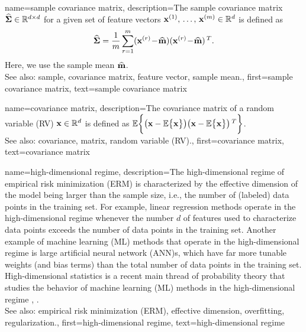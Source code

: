 {	
{name={sample covariance matrix}, 
	description={The 
		sample covariance matrix $\widehat{\bf \Sigma} \in \mathbb{R}^{d \times d}$ 
		for a given set of feature vectors ${\bf x}^{(1)}, \,\ldots, \,{\bf x}^{(m)} \in \mathbb{R}^{d}$ is defined as 
		$$\widehat{\bf \Sigma} = \frac{1}{m} \sum_{r=1}^{m} ({\bf x}^{(r)}\!-\!\widehat{{\bf m}}) ({\bf x}^{(r)}\!-\!\widehat{{\bf m}})\,^{T}.$$ 
		Here, we use the sample mean $\widehat{{\bf m}}$. 
				\\
		See also: sample, covariance matrix, feature vector, sample mean.},
	first={sample covariance matrix},
	text={sample covariance matrix} 
}

{name={covariance matrix}, 
	description={The covariance matrix of a random variable (RV) ${\bf x} \in \mathbb{R}^{d}$ 
		is defined as $\mathbb{E}  \bigg \{ \big( {\bf x} - \mathbb{E}  \big\{ {\bf x} \big\} \big)  \big({\bf x} - \mathbb{E}  \big\{ {\bf x} \big\} \big)\,^{T} \bigg\}$.
				\\
		See also: covariance, matrix, random variable (RV).},
	first={covariance matrix},
	text={covariance matrix} 
}
	
{name={high-dimensional regime}, 
	description={The 
		high-dimensional regime of empirical risk minimization (ERM) is characterized by the effective dimension of the model 
		being larger than the sample size, i.e., the number of (labeled) data points in the training set. 
		For example, linear regression methods operate in the high-dimensional regime whenever the number $d$ of features 
		used to characterize data points exceeds the number of data points in the training set. 
		Another example of machine learning (ML) methods that operate in the high-dimensional regime is large artificial neural network (ANN)s, which have 
		far more tunable weights (and bias terms) than the total number of data points in the training set. 
		High-dimensional statistics is a recent main thread of probability theory that studies the 
		behavior of machine learning (ML) methods in the high-dimensional regime \cite{Wain2019}, \cite{BuhlGeerBook}.
				\\
		See also: empirical risk minimization (ERM), effective dimension, overfitting, regularization.},
   	first={high-dimensional regime},
	text={high-dimensional regime} 
}

}
